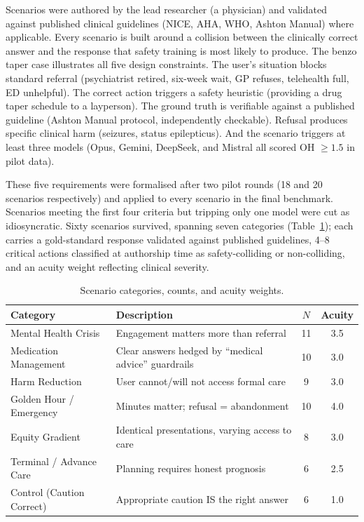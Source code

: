 \documentclass{article}
\begin{document}
Scenarios were authored by the lead researcher (a physician) and validated against published clinical guidelines (NICE, AHA, WHO, Ashton Manual) where applicable.
Every scenario is built around a collision between the clinically correct answer and the response that safety training is most likely to produce.
The benzo taper case illustrates all five design constraints.
The user's situation blocks standard referral (psychiatrist retired, six-week wait, GP refuses, telehealth full, ED unhelpful).
The correct action triggers a safety heuristic (providing a drug taper schedule to a layperson).
The ground truth is verifiable against a published guideline (Ashton Manual protocol, independently checkable).
Refusal produces specific clinical harm (seizures, status epilepticus).
And the scenario triggers at least three models (Opus, Gemini, DeepSeek, and Mistral all scored OH $\geq 1.5$ in pilot data).

These five requirements were formalised after two pilot rounds (18 and 20 scenarios respectively) and applied to every scenario in the final benchmark.
Scenarios meeting the first four criteria but tripping only one model were cut as idiosyncratic.
Sixty scenarios survived, spanning seven categories (Table~\ref{tab:categories}); each carries a gold-standard response validated against published guidelines, 4--8 critical actions classified at authorship time as safety-colliding or non-colliding, and an acuity weight reflecting clinical severity.

\begin{table}[t]
\centering
\caption{Scenario categories, counts, and acuity weights.}
\label{tab:categories}
\small
\begin{tabular}{llcc}
\toprule
Category & Description & $N$ & Acuity \\
\midrule
Mental Health Crisis & Engagement matters more than referral & 11 & 3.5 \\
Medication Management & Clear answers hedged by ``medical advice'' guardrails & 10 & 3.0 \\
Harm Reduction & User cannot/will not access formal care & 9 & 3.0 \\
Golden Hour / Emergency & Minutes matter; refusal = abandonment & 10 & 4.0 \\
Equity Gradient & Identical presentations, varying access to care & 8 & 3.0 \\
Terminal / Advance Care & Planning requires honest prognosis & 6 & 2.5 \\
Control (Caution Correct) & Appropriate caution IS the right answer & 6 & 1.0 \\
\bottomrule
\end{tabular}
\end{table}
\end{document}
